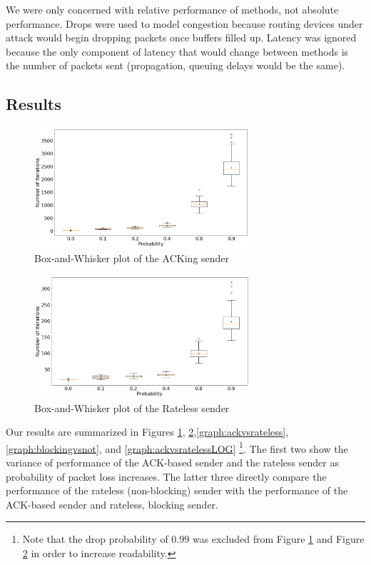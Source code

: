 We were only concerned with relative performance of methods, not absolute performance. Drops were used to model congestion because routing devices under attack would begin dropping packets once buffers filled up. Latency was ignored because the only component of latency that would change between methods is the number of packets sent (propagation, queuing delays would be the same). 

\subsection{Results}

\begin{figure}[tp]
\centering
\noindent
\includegraphics[width=8cm]{figures/big_font/ack_trim.png}
\caption{Box-and-Whisker plot of the ACKing sender }
\label{graph:ack}
\end{figure}

\begin{figure}[tp]
\centering
\noindent
\includegraphics[width=8cm]{figures/big_font/rateless_trim.png}
\caption{Box-and-Whisker plot of the Rateless sender}
\label{graph:rateless}
\end{figure}


Our results are summarized in Figures \ref{graph:ack}, \ref{graph:rateless},\ref{graph:ackvsrateless}, \ref{graph:blockingvsnot}, and \ref{graph:ackvsratelessLOG} \footnote{Note that the drop probability of $0.99$ was excluded from Figure \ref{graph:ack} and Figure \ref{graph:rateless} in order to increase readability.}. The first two show the variance of performance of the ACK-based sender and the rateless sender as probability of packet loss increases. The latter three directly compare the performance of the rateless (non-blocking) sender with the performance of the ACK-based sender and rateless, blocking sender. 

